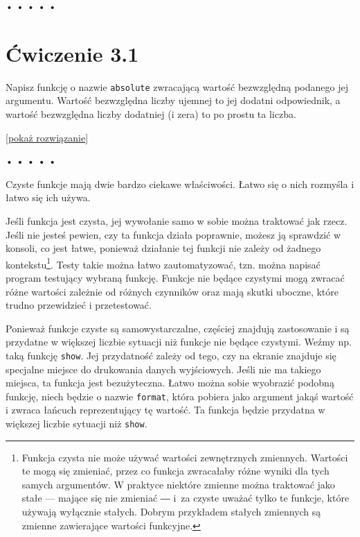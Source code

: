   
  
\begin{center}
• • • • •
\end{center}
  
    
\section*{Ćwiczenie 3.1}
\label{sec:3.1}
    
      
Napisz funkcję o nazwie \texttt{absolute} zwracającą wartość bezwzględną podanego jej argumentu. Wartość bezwzględna liczby ujemnej to jej dodatni odpowiednik, a wartość bezwzględna liczby dodatniej (i zera) to po prostu ta liczba.

    
[\hyperref[sol:3.1]{pokaż rozwiązanie}]
    
    
  
  
\begin{center}
• • • • •
\end{center}
  
    
Czyste funkcje mają dwie bardzo ciekawe właściwości. Łatwo się o nich rozmyśla i łatwo się ich używa.

    
Jeśli funkcja jest czysta, jej wywołanie samo w sobie można traktować jak rzecz. Jeśli nie jesteś pewien, czy ta funkcja działa poprawnie, możesz ją sprawdzić w konsoli, co jest łatwe, ponieważ działanie tej funkcji nie zależy od żadnego kontekstu\footnote{Funkcja czysta nie może używać wartości zewnętrznych zmiennych. Wartości te mogą się zmieniać, przez co funkcja zwracałaby różne wyniki dla tych samych argumentów. W praktyce niektóre zmienne można traktować jako stałe — mające się nie zmieniać ― i~za czyste uważać tylko te funkcje, które używają wyłącznie stałych. Dobrym przykładem stałych zmiennych są zmienne zawierające wartości funkcyjne.}. Testy takie można łatwo zautomatyzować, tzn. można napisać program testujący wybraną funkcję. Funkcje nie będące czystymi mogą zwracać różne wartości zależnie od różnych czynników oraz mają skutki uboczne, które trudno przewidzieć i przetestować.

    
Ponieważ funkcje czyste są samowystarczalne, częściej znajdują zastosowanie i są przydatne w większej liczbie sytuacji niż funkcje nie będące czystymi. Weźmy np. taką funkcję \texttt{show}. Jej przydatność zależy od tego, czy na ekranie znajduje się specjalne miejsce do drukowania danych wyjściowych. Jeśli nie ma takiego miejsca, ta funkcja jest bezużyteczna. Łatwo można sobie wyobrazić podobną funkcję, niech będzie o nazwie \texttt{format}, która pobiera jako argument jakąś wartość i zwraca łańcuch reprezentujący tę wartość. Ta funkcja będzie przydatna w większej liczbie sytuacji niż \texttt{show}.

